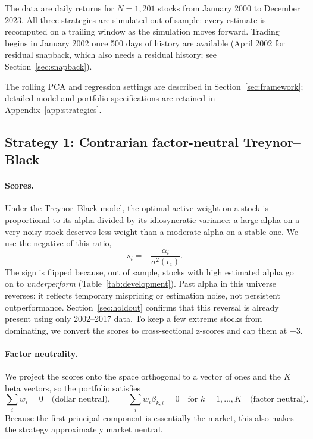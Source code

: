 \documentclass[11pt,letterpaper]{article}
\begin{document}
The data are daily returns for $N = 1{,}201$ stocks from January 2000 to December 2023. All
three strategies are simulated out-of-sample: every estimate is recomputed on a trailing
window as the simulation moves forward. Trading begins in January 2002 once 500 days of
history are available (April 2002 for residual snapback, which also needs a residual
history; see Section~\ref{sec:snapback}).

The rolling PCA and regression settings are described in Section~\ref{sec:framework};
detailed model and portfolio specifications are retained in Appendix~\ref{app:strategies}.

\subsection{Strategy 1: Contrarian factor-neutral Treynor--Black}

\paragraph{Scores.} Under the Treynor--Black model, the optimal active weight on a stock is
proportional to its alpha divided by its idiosyncratic variance: a large alpha on a very
noisy stock deserves less weight than a moderate alpha on a stable one. We use the negative
of this ratio,
\[
    s_i = -\frac{\alpha_i}{\sigma^2(\epsilon_i)}.
\]
The sign is flipped because, out of sample, stocks with high estimated alpha go on to
\emph{underperform} (Table~\ref{tab:development}). Past alpha in this universe reverses: it
reflects temporary mispricing or estimation noise, not persistent outperformance.
Section~\ref{sec:holdout} confirms that this reversal is already present using only
2002--2017 data. To keep a few extreme stocks from dominating, we convert the scores to
cross-sectional z-scores and cap them at $\pm 3$.

\paragraph{Factor neutrality.} We project the scores onto the space orthogonal to a vector
of ones and the $K$ beta vectors, so the portfolio satisfies
\[
    \sum_i w_i = 0 \quad \text{(dollar neutral)}, \qquad \sum_i w_i \beta_{k,i} = 0 \quad \text{for } k = 1, \dots, K \quad \text{(factor neutral)}.
\]
Because the first principal component is essentially the market, this also makes the
strategy approximately market neutral.
\end{document}
